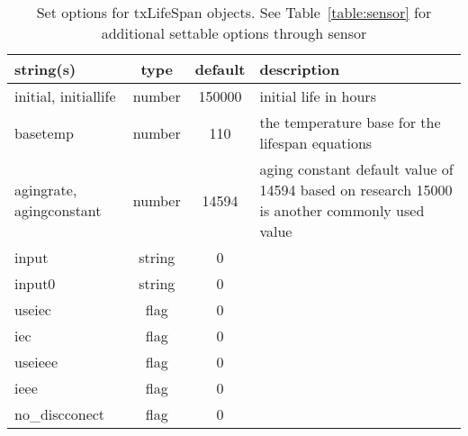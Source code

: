 \begin{table}[ht]
\centering
\begin{tabular}{p{5cm} c c p{7cm}}
\hline
string(s) & type & default & description \\
\hline
initial, initiallife & number & 150000 & initial life in hours\\
basetemp & number & 110 & the temperature base for the lifespan equations\\
agingrate, agingconstant & number & 14594 & aging constant default value of 14594 based on research 15000 is another commonly used value\\
input & string & 0 & \\
input0 & string & 0 & \\
useiec & flag & 0 & \\
iec & flag & 0 & \\
useieee & flag & 0 & \\
ieee & flag & 0 & \\
no\_discconect & flag & 0 & \\
\hline
\end{tabular}
\caption{Set options for txLifeSpan objects. See Table~\ref{table:sensor} for additional settable options through sensor}
\label{table:txLifeSpan}
\end{table}
